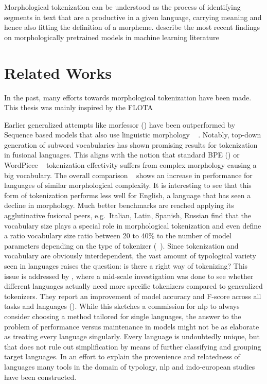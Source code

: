 
Morphological tokenization can be understood as the process of identifying segments in text that are a productive in a given language, carrying meaning and hence also fitting the definition of a morpheme.
describe the most recent findings on morphologically pretrained models in machine learning literature


\section{Related Works}
\label{sec:related-works}

In the past, many efforts towards morphological tokenization have been made.
This thesis was mainly inspired by the FLOTA

Earlier generalized attempts like morfessor (\cite{morfessor}) have been outperformed by Sequence based models that also use linguistic morphology ~\cite{subwordvsmorfessor} .
Notably, top-down generation of subword vocabularies has shown promising results for tokenization in fusional languages.
This aligns with the notion that standard BPE (\cite{BPE}) or WordPiece ~\cite{WORDPIECEGOOGLE} tokenization effectivity suffers from complex morphology causing a big vocabulary.
The overall comparison ~\cite[134]{subwordvsmorfessor} shows an increase in performance for languages of similar morphological complexity.
It is interesting to see that this form of tokenization performs less well for English, a language that has seen a decline in morphology.
Much better benchmarks are reached applying  its agglutinative fusional peers, e.g.\ Italian, Latin, Spanish, Russian
\citeauthor{TOKENIZATIONIMPACT} find that the vocabulary size plays a special role in morphological tokenization and even define a ratio vocabulary size ratio between 20 to 40\% to the number of model parameters depending on the type of tokenizer (~\cite[11--12]{TOKENIZATIONIMPACT}).
Since tokenization and vocabulary are obviously interdependent, the vast amount of typological variety seen in languages raises the question: is there a right way of tokenizing?
This issue is addressed by \citeauthor{MONOLINGUAL}, where a mid-scale investigation was done to see whether different languages actually need more specific tokenizers compared to generalized tokenizers.
They report an improvement of model accuracy and F-score across all tasks and languages (\cite{MONOLINGUAL}).
While this sketches a commission for \ac{nlp} to always consider choosing a method tailored for single languages, the answer to the problem of performance versus maintenance in models might not be as elaborate as treating every language singularly.
Every language is undoubtedly unique, but that does not rule out simplification by means of further classifying and grouping target languages.
In an effort to explain the provenience and relatedness of languages many tools in the domain of typology, \ac{nlp} and indo-european studies have been constructed.

